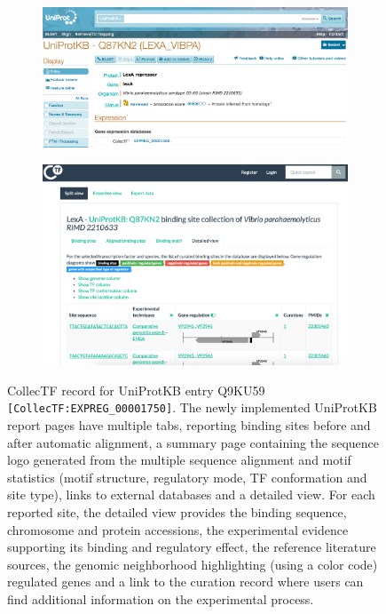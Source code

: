 \begin{figure}
  \centering
  \begin{subfigure}{0.7\textwidth}
    \includegraphics[width=1\textwidth]{figures/chapter2/uniprot}
  \end{subfigure}

  \begin{subfigure}{0.7\textwidth}
    \includegraphics[width=1\textwidth]{figures/chapter2/protein-record}
  \end{subfigure}

  \caption{CollecTF record for UniProtKB entry Q9KU59
    \texttt{[CollecTF:EXPREG\_00001750]}. The newly implemented
    UniProtKB report pages have multiple tabs, reporting binding sites before
    and after automatic alignment, a summary page containing the sequence logo
    generated from the multiple sequence alignment and motif statistics (motif
    structure, regulatory mode, TF conformation and site type), links to
    external databases and a detailed view. For each reported site, the
    detailed view provides the binding sequence, chromosome and protein
    accessions, the experimental evidence supporting its binding and regulatory
    effect, the reference literature sources, the genomic neighborhood
    highlighting (using a color code) regulated genes and a link to the
    curation record where users can find additional information on the
    experimental process.}
\label{fig:uniprot-integration}
\end{figure}

